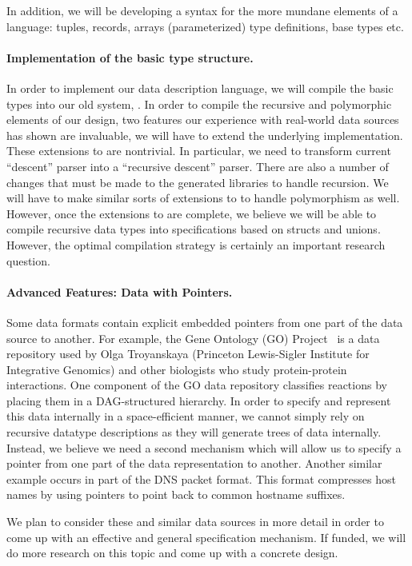 \documentclass[11pt]{article}
\begin{document}
In addition, we will be developing a syntax for the more mundane
elements of a language: tuples, records, arrays
(parameterized) type definitions, base types etc.

\paragraph*{Implementation of the basic type structure.}
In order to implement our data description language,
we will compile the basic types into our old system, \pads.
In order to compile the recursive and polymorphic
elements of our design, 
two features our experience with real-world data sources
has shown are invaluable,
we will have to extend the underlying \pads{}
implementation.  These extensions to \pads{}
are nontrivial.  In particular,
we need to transform \pads{} current ``descent'' parser into
a ``recursive descent'' parser.  
There are also a number of changes that must be made to
the generated libraries to handle recursion.  
We will have to make similar sorts of extensions
to \pads{} to handle polymorphism as well.  However,
once the extensions to \pads{} are complete,
we believe we will be able to compile recursive data types
into specifications based on \pads{} structs and unions.
However, the optimal compilation strategy is certainly
an important research question.

\paragraph*{Advanced Features:  Data with Pointers.}
Some data formats contain explicit embedded pointers 
from one part of the data source to another.
For example, the Gene Ontology (GO)
Project~\cite{geneontology} is a data repository used by Olga
Troyanskaya (Princeton Lewis-Sigler Institute for Integrative
Genomics) and other biologists who study protein-protein interactions.
One component of the GO data repository classifies reactions by
placing them in a DAG-structured hierarchy.  In order
to specify and represent this data internally in a 
space-efficient manner, we cannot simply rely on
recursive datatype descriptions as they will
generate trees of data internally.  Instead,
we believe we need a second mechanism which will allow us to specify
a pointer from one part of the data representation to another.
Another similar example occurs in
part of the DNS packet format.  This format compresses
host names by using pointers to point back to common
hostname suffixes. 

We plan to consider these and similar data sources in more detail
in order to come up with an effective and general specification mechanism.
If funded, we will do more research on this topic and come up with
a concrete design.
\end{document}
